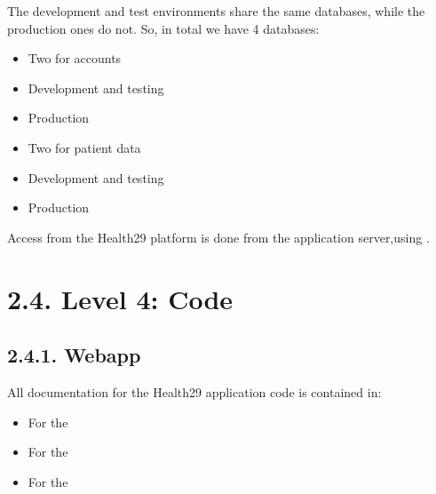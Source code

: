 \documentclass[letterpaper,10pt,english]{sphinxmanual}
\begin{document}
The development and test environments share the same databases, while the production ones do not. So, in total we have 4 databases:
\begin{itemize}
\item {} 
Two for accounts

\end{itemize}
\begin{itemize}
\item {} 
Development and testing

\item {} 
Production

\end{itemize}
\begin{itemize}
\item {} 
Two for patient data

\end{itemize}
\begin{itemize}
\item {} 
Development and testing

\item {} 
Production

\end{itemize}



Access from the Health29 platform is done from the application server,using .




\chapter{2.4. Level 4: Code}
\label{\detokenize{pages/SW/Code:level-4-code}}\label{\detokenize{pages/SW/Code::doc}}

\section{2.4.1. Webapp}
\label{\detokenize{pages/SW/Code:webapp}}
All documentation for the Health29 application code is contained in:
\begin{itemize}
\item {} 
For the 

\item {} 
For the 

\item {} 
For the 

\end{itemize}
\end{document}
